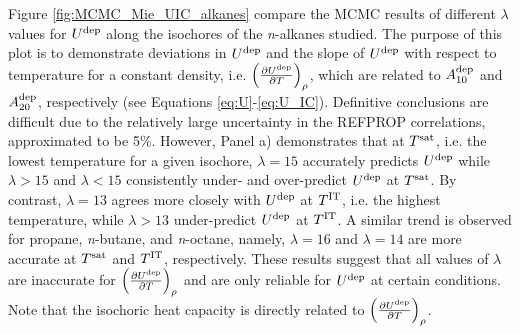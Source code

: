 \documentclass[journal=jctc,manuscript=article]{achemso}
\begin{document}
Figure \ref{fig:MCMC_Mie_UIC_alkanes} compare the MCMC results of different $\lambda$ values for $U^{\rm dep}$ along the isochores of the \textit{n}-alkanes studied. The purpose of this plot is to demonstrate deviations in $U^{\rm dep}$ and the slope of $U^{\rm dep}$ with respect to temperature for a constant density, i.e. $\left(\frac{\partial U^{\rm dep}}{\partial T}\right)_\rho$, which are related to $A_{10}^{\rm dep}$ and $A_{20}^{\rm dep}$, respectively (see Equations \ref{eq:U}-\ref{eq:U_IC}). Definitive conclusions are difficult due to the relatively large uncertainty in the REFPROP correlations, approximated to be 5\%. However, Panel a) demonstrates that at $T^{\rm sat}$, i.e. the lowest temperature for a given isochore, $\lambda = 15$ accurately predicts $U^{\rm dep}$ while $\lambda > 15$ and $\lambda < 15$ consistently under- and over-predict $U^{\rm dep}$ at $T^{\rm sat}$. By contrast, $\lambda = 13$ agrees more closely with $U^{\rm dep}$ at $T^{\rm IT}$, i.e. the highest temperature, while $\lambda > 13$ under-predict $U^{\rm dep}$ at $T^{\rm IT}$. A similar trend is observed for propane, \textit{n}-butane, and \textit{n}-octane, namely, $\lambda = 16$ and $\lambda = 14$ are more accurate at $T^{\rm sat}$ and $T^{\rm IT}$, respectively. These results suggest that all values of $\lambda$ are inaccurate for $\left(\frac{\partial U^{\rm dep}}{\partial T}\right)_\rho$ and are only reliable for $U^{\rm dep}$ at certain conditions. Note that the isochoric heat capacity is directly related to $\left(\frac{\partial U^{\rm dep}}{\partial T}\right)_\rho$.
\end{document}
